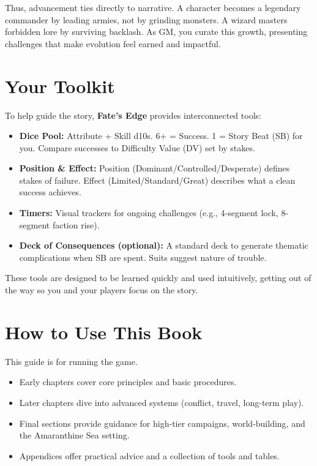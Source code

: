 Thus, advancement ties directly to narrative. A character becomes a legendary commander by leading armies, not by grinding monsters. A wizard masters forbidden lore by surviving backlash. As GM, you curate this growth, presenting challenges that make evolution feel earned and impactful.

\section{Your Toolkit}
\label{sec:gm-toolkit}

To help guide the story, \textbf{Fate's Edge} provides interconnected tools:

\begin{itemize}
    \item \textbf{Dice Pool:} Attribute + Skill d10s. 6+ = Success. 1 = Story Beat (SB) for you. Compare successes to Difficulty Value (DV) set by stakes.
    \item \textbf{Position \& Effect:} Position (Dominant/Controlled/Desperate) defines stakes of failure. Effect (Limited/Standard/Great) describes what a clean success achieves.
    \item \textbf{Timers:} Visual trackers for ongoing challenges (e.g., 4-segment lock, 8-segment faction rise).
    \item \textbf{Deck of Consequences (optional):} A standard deck to generate thematic complications when SB are spent. Suits suggest nature of trouble.
\end{itemize}

These tools are designed to be learned quickly and used intuitively, getting out of the way so you and your players focus on the story.

\section{How to Use This Book}
\label{sec:gm-how-to-use}

This guide is for running the game.

\begin{itemize}
    \item Early chapters cover core principles and basic procedures.
    \item Later chapters dive into advanced systems (conflict, travel, long-term play).
    \item Final sections provide guidance for high-tier campaigns, world-building, and the Amaranthine Sea setting.
    \item Appendices offer practical advice and a collection of tools and tables.
\end{itemize}

